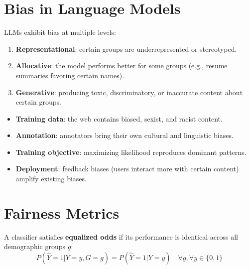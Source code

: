 \section{Bias in Language Models}
\label{sec:ethics:lm_bias}

\begin{definition}
LLMs exhibit bias at multiple levels:
\begin{enumerate}
    \item \textbf{Representational}: certain groups are underrepresented
    or stereotyped.
    \item \textbf{Allocative}: the model performs better for some groups
    (e.g., resume summaries favoring certain names).
    \item \textbf{Generative}: producing toxic, discriminatory, or
    inaccurate content about certain groups.
\end{enumerate}
\end{definition}

\begin{proposition}
\begin{itemize}
    \item \textbf{Training data}: the web contains biased, sexist, and
    racist content.
    \item \textbf{Annotation}: annotators bring their own cultural and
    linguistic biases.
    \item \textbf{Training objective}: maximizing likelihood reproduces
    dominant patterns.
    \item \textbf{Deployment}: feedback biases (users interact more with
    certain content) amplify existing biases.
\end{itemize}
\end{proposition}

\section{Fairness Metrics}
\label{sec:ethics:metrics}

\begin{definition}
A classifier satisfies \textbf{equalized odds} if its performance is
identical across all demographic groups $g$:
\[
    P(\hat{Y} = 1 | Y = y, G = g) = P(\hat{Y} = 1 | Y = y)
    \quad \forall g, \forall y \in \{0, 1\}
\]
\end{definition}

